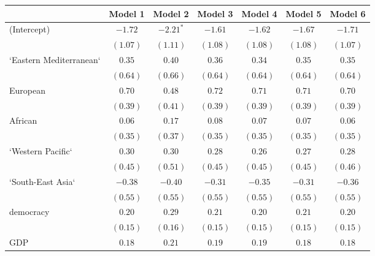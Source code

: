 
\begin{table}[!h]
\begin{center}
\begin{tabular}{l c c c c c c }
\toprule
 & Model 1 & Model 2 & Model 3 & Model 4 & Model 5 & Model 6 \\
\midrule
(Intercept)             & $-1.72$      & $-2.21^{*}$  & $-1.61$      & $-1.62$      & $-1.67$      & $-1.71$      \\
                        & $(1.07)$     & $(1.11)$     & $(1.08)$     & $(1.08)$     & $(1.08)$     & $(1.07)$     \\
`Eastern Mediterranean` & $0.35$       & $0.40$       & $0.36$       & $0.34$       & $0.35$       & $0.35$       \\
                        & $(0.64)$     & $(0.66)$     & $(0.64)$     & $(0.64)$     & $(0.64)$     & $(0.64)$     \\
European                & $0.70$       & $0.48$       & $0.72$       & $0.71$       & $0.71$       & $0.70$       \\
                        & $(0.39)$     & $(0.41)$     & $(0.39)$     & $(0.39)$     & $(0.39)$     & $(0.39)$     \\
African                 & $0.06$       & $0.17$       & $0.08$       & $0.07$       & $0.07$       & $0.06$       \\
                        & $(0.35)$     & $(0.37)$     & $(0.35)$     & $(0.35)$     & $(0.35)$     & $(0.35)$     \\
`Western Pacific`       & $0.30$       & $0.30$       & $0.28$       & $0.26$       & $0.27$       & $0.28$       \\
                        & $(0.45)$     & $(0.51)$     & $(0.45)$     & $(0.45)$     & $(0.45)$     & $(0.46)$     \\
`South-East Asia`       & $-0.38$      & $-0.40$      & $-0.31$      & $-0.35$      & $-0.31$      & $-0.36$      \\
                        & $(0.55)$     & $(0.55)$     & $(0.55)$     & $(0.55)$     & $(0.55)$     & $(0.55)$     \\
democracy               & $0.20$       & $0.29$       & $0.21$       & $0.20$       & $0.21$       & $0.20$       \\
                        & $(0.15)$     & $(0.16)$     & $(0.15)$     & $(0.15)$     & $(0.15)$     & $(0.15)$     \\
GDP                     & $0.18$       & $0.21$       & $0.19$       & $0.19$       & $0.18$       & $0.18$       \\

\end{tabular}
\end{center}
\end{table}
